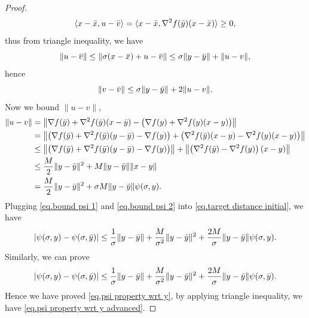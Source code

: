 \documentclass{mcom-l}
\numberwithin{equation}{section}
\begin{document}
\begin{proof}
\begin{equation*}
        \langle x-\Bar{x},u-\Bar{v}\rangle = \langle x-\Bar{x},\nabla ^2 f(\Bar{y})(x-\Bar{x})\rangle\geq 0,
    \end{equation*}
    thus from triangle inequality, we have
    \begin{equation*}
        \|u-\Bar{v}\| \leq \|\sigma(x-\Bar{x})+u-\Bar{v}\| \leq \sigma \|y-\Bar{y}\|+\|u-v\|,
    \end{equation*}
    hence
    \begin{equation}\label{eq.bound psi 1}
        \|v-\Bar{v}\| \leq \sigma\|y-\Bar{y}\| +2\|u-v\|.
    \end{equation}
    Now we bound $\|u-v\|$,
    \begin{equation}\label{eq.bound psi 2}
        \begin{aligned}
            \|u-v\| & = \left\|\nabla f(\Bar{y})+\nabla ^2 f(\Bar{y})(x-\Bar{y})-\left(\nabla f(y) + \nabla ^2 f(y)(x-y)\right)\right\|                                                              \\
                    & = \left\|\left(\nabla f(\Bar{y})+\nabla^2 f(\Bar{y})(y-\Bar{y})-\nabla f(y)\right)+\left(\nabla^2 f(\Bar{y})(x-y)-\nabla^2 f(y)(x-y)\right)\right\|                            \\
                    & \leq \left\|\left(\nabla f(\Bar{y})+\nabla^2 f(\Bar{y})(y-\Bar{y})-\nabla f(y)\right)\right \| +\left \|\left(\nabla^2 f(\Bar{y})-\nabla^2 f(y)\right)\left(x-y\right)\right\| \\
                    & \leq \frac{M}{2}\|y-\Bar{y}\|^2+M\|y-\Bar{y}\|\|x-y\|                                                                                                                          \\
                    & =\frac{M}{2}\|y-\Bar{y}\|^2+\sigma M \|y-\Bar{y}\|\psi(\sigma,y).
        \end{aligned}
    \end{equation}
    Plugging \eqref{eq.bound psi 1} and \eqref{eq.bound psi 2} into \eqref{eq.target distance initial}, we have
    \begin{equation*}
        \left \vert \psi(\sigma,y)-\psi(\sigma,\Bar{y}) \right\vert \leq \frac{1}{\sigma}\|y-\Bar{y}\| +\frac{M}{\sigma^2}\|y-\Bar{y}\|^2 +\frac{2M}{\sigma}\|y-\Bar{y}\|\psi(\sigma,y).
    \end{equation*}
    Similarly, we can prove
    \begin{equation*}
        \left \vert \psi(\sigma,y)-\psi(\sigma,\Bar{y}) \right\vert \leq \frac{1}{\sigma}\|y-\Bar{y}\| +\frac{M}{\sigma^2}\|y-\Bar{y}\|^2 +\frac{2M}{\sigma}\|y-\Bar{y}\|\psi(\sigma,\Bar{y}).
    \end{equation*}
    Hence we have proved \eqref{eq.psi property wrt y}, by applying triangle inequality, we have \eqref{eq.psi property wrt y advanced}.
\end{proof}
\end{document}
